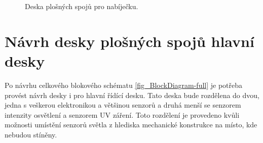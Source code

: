 \begin{figure}[h]
    \centering
    \quad
    \caption{Deska plošných spojů pro nabíječku.}
    \label{fig_chargerBoardKiCad}
\end{figure}

\section{Návrh desky plošných spojů hlavní desky}

Po návrhu celkového blokového schématu \ref{fig_BlockDiagram-full} je potřeba provést návrh desky i pro hlavní řídící desku. Tato deska bude rozdělena do dvou, jedna s veškerou elektronikou a většinou senzorů a druhá menší se senzorem intenzity osvětlení a senzorem UV záření. Toto rozdělení je provedeno kvůli možnosti umístění senzorů světla z hlediska mechanické konstrukce na místo, kde nebudou stíněny. 

